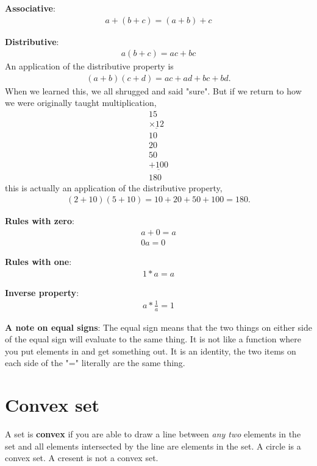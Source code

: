 \documentclass[12pt]{article}
\begin{document}
\textbf{Associative}: 
\begin{align*}
    a+ (b+c) = (a+b) +c
\end{align*}

\textbf{Distributive}:
\begin{align*}
    a(b+c) = ac+ bc
\end{align*}
An application of the distributive property is 
\begin{align*}
    (a +b) (c+d) = ac + ad + bc + bd.
\end{align*}
When we learned this, we all shrugged and said "sure".  But if we return to how we were originally taught multiplication, 
\begin{align*}
    15 \\
    \underline{\times 12} \\
    10\\
    20 \\
    50\\
   \underline{+ 100}\\
   180
\end{align*}
this is actually an application of the distributive property, 
\begin{align}
    (2+10)(5+10) = 10 + 20 +50 + 100 = 180.
\end{align}



\textbf{Rules with zero}:
\begin{align*}
    a+ 0 = a \\
    0a = 0
\end{align*}

\textbf{Rules with one}:
\begin{align*}
    1*a = a
\end{align*}

\textbf{Inverse property}:
\begin{align*}
    a* \frac{1}{a} = 1
\end{align*}

\textbf{A note on equal signs}: The equal sign means that the two things on either side of the equal sign will evaluate to the same thing. It is not like a function where you put elements in and get something out. It is an identity, the two items on each side of the "=" literally are the same thing.

\section{Convex set}
A set is \textbf{convex} if you are able to draw a line between \textit{any two} elements in the set and all elements intersected by the line are elements in the set. A circle is a convex set. A cresent is not a convex set. \\
\end{document}
